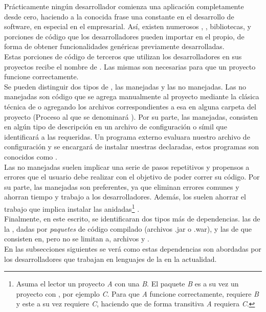 Prácticamente ningún desarrollador comienza una aplicación completamente desde
cero, haciendo a la conocida frase  una
constante en el desarrollo de software, en especial en el empresarial. Así, existen
numerosos \frameworks, \toolkits, bibliotecas, y porciones de código que los
desarrolladores pueden importar en el propio, de forma de obtener funcionalidades
genéricas previamente desarrolladas.\\
Estas porciones de código de terceros que utilizan los desarrolladores en sus
proyectos recibe el nombre de \dependencies. Las mismas son necesarias
para que un proyecto funcione correctamente.\\
Se pueden distinguir dos tipos de \dependencies, las manejadas y las no manejadas.
Las \dependencies no manejadas son código que se agrega manualmente al
proyecto mediante la clásica técnica de  o agregando los archivos
correspondientes a esa \dependency en alguna carpeta del proyecto (Proceso al que
se denominará ). Por su parte, las manejadas, consisten en algún tipo de
descripción en un archivo de configuración o símil que identificará a las \dependencies
requeridas. Un programa externo evaluara nuestro archivo de configuración y se encargará
de instalar nuestras \dependencies declaradas, estos programas son conocidos como
\depmgrs.\\
Las \dependencies no manejadas suelen implicar una serie de pasos repetitivos y propensos
a errores que el usuario debe realizar con el objetivo de poder correr su código. Por su
parte, las \dependencies manejadas son preferentes, ya que eliminan errores comunes y
ahorran tiempo y trabajo a los desarrolladores. Además, los \depmgrs
suelen ahorrar el trabajo que implica instalar las \dependencies anidadas\footnote{
	Asuma el lector un proyecto \emph{A} con una \dependency \emph{B}. El paquete \emph{B}
	es a su vez un proyecto con \dependencies, por ejemplo \emph{C}. Para que \emph{A}
	funcione correctamente, requiere \emph{B} y este a su vez requiere \emph{C}, haciendo
	que de forma transitiva \emph{A} requiera \emph{C}.
} .\\
Finalmente, en este escrito, se identificaran dos tipos más de dependencias. las de la
\logictier, dadas por \emph{paquetes} de código \java compilado (archivos .jar o .war),
y las de \viewtier que consisten en, pero no se limitan a, archivos \css y \js.\\
En las subsecciones siguientes se verá como estas dependencias son abordadas por los
desarrolladores que trabajan en lenguajes de la \jvm en la actualidad.

